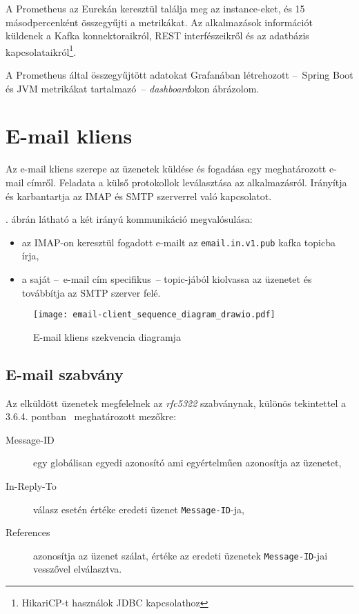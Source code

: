 A Prometheus az Eurekán keresztül találja meg az instance-eket, és 15 másodpercenként összegyűjti a metrikákat. Az alkalmazások információt küldenek a Kafka konnektoraikról, REST interfészeikről és az adatbázis kapcsolataikról\footnote{HikariCP-t használok JDBC kapcsolathoz}.

A Prometheus által összegyűjtött adatokat Grafanában létrehozott --~Spring Boot és JVM metrikákat tartalmazó~--   \emph{dashboard}okon ábrázolom.


\section{E-mail kliens}
Az e-mail kliens szerepe az üzenetek küldése és fogadása egy meghatározott e-mail címről. Feladata a külső protokollok leválasztása az alkalmazásról. Irányítja és karbantartja az IMAP és SMTP szerverrel való kapcsolatot.

. ábrán látható a két irányú kommunikáció megvalósulása:
\begin{itemize}
	\item az IMAP-on keresztül fogadott e-mailt az \texttt{email.in.v1.pub} kafka topicba írja,
	\item a saját --~e-mail cím specifikus~-- topic-jából kiolvassa az üzenetet és továbbítja  az SMTP szerver felé.
\end{itemize}


\begin{figure}[hbt] 
	\centering
	\texttt{[image: email-client\_sequence\_diagram\_drawio.pdf]}
	\caption{E-mail kliens szekvencia diagramja}
	\label{fig:email-client_sequence_diagram}
\end{figure}




\subsection{E-mail szabvány}
Az elküldött üzenetek megfelelnek az \emph{rfc5322} szabványnak, különös tekintettel a 3.6.4. pontban~\cite{rfc5322_Identification_Fields} meghatározott mezőkre:

\begin{description}
	\item[Message-ID] egy globálisan egyedi azonosító ami egyértelműen azonosítja az üzenetet,
	
	\item[In-Reply-To] válasz esetén értéke eredeti üzenet \texttt{Message-ID}-ja,
	
	\item[References] azonosítja az üzenet szálat, értéke az eredeti üzenetek \texttt{Message-ID}-jai vesszővel elválasztva.
\end{description}


